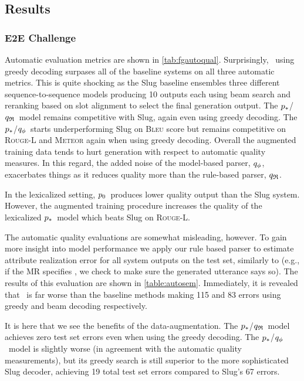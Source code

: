




\subsection{Results}
\subsubsection{E2E Challenge}

Automatic evaluation metrics are shown in \autoref{tab:fgautoqual}.
Surprisingly, \basegen~using greedy decoding surpases all of the 
baseline systems on all three automatic metrics. 
This is quite shocking as the Slug baseline ensembles
three different sequence-to-sequence models producing 10 outputs each using beam search and reranking based on slot alignment to select the final generation
output. The $p_*$/${q_{\mathfrak{R}} }$~model remains competitive with Slug, 
again even using greedy decoding.
The $p_*$/${q_{\phi} }$~starts underperforming Slug on \textsc{Bleu} 
score but
remains competitive on \textsc{Rouge-L} and \textsc{Meteor} again when using 
greedy decoding.
Overall the augmented training data tends to hurt generation with respect
to automatic quality measures.
In this regard, the added noise of the model-based parser, ${q_{\phi} }$,
 exacerbates things
as it reduces quality more than the rule-based parser, ${q_{\mathfrak{R}} }$. 

In the lexicalized setting,
$p_0$~produces lower quality output than the Slug system.
However, the augmented training procedure increases
the quality of the lexicalized $p_*$~model which beats Slug on \textsc{Rouge-L}.


The automatic quality evaluations are somewhat misleading, however. To gain
more insight into model performance
we apply our rule based parser to estimate attribute realization error
for all system outputs on the test set,
similarly to \cite{dusek2019}
(e.g., if the MR specifies ,
we check to make sure the generated utterance says so). 
The results of this evaluation are shown in \autoref{table:autosem}.
Immediately, it is revealed that \basegen~is far worse than the baseline 
methods making 115 and 83 errors using greedy and beam decoding respectively.

It is here that we see the benefits of the data-augmentation.
The $p_*$/${q_{\mathfrak{R}} }$~model achieves zero test set
errors even when using the greedy 
decoding. The $p_*$/${q_{\phi} }$~model is slightly worse (in agreement 
with the automatic quality measurements), but its greedy search is still
superior to the more sophisticated Slug decoder, achieving 19 total
test set errors compared to Slug's 67 errors.



